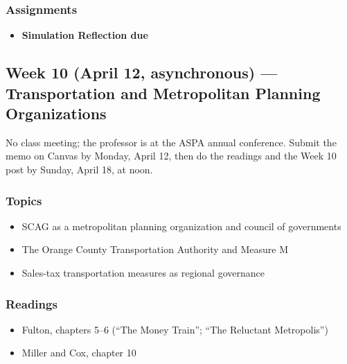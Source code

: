 \documentclass[12pt]{article}
\begin{document}
    \subsubsection*{Assignments}
        \begin{itemize}
            \item \textbf{Simulation Reflection due}
        \end{itemize}

\subsection*{Week 10 (April 12, asynchronous) --- Transportation and Metropolitan Planning Organizations}
    \noindent No class meeting; the professor is at the ASPA annual conference. Submit the memo on Canvas by Monday, April 12, then do the readings and the Week 10 post by Sunday, April 18, at noon.
    \subsubsection*{Topics}
        \begin{itemize}
            \item SCAG as a metropolitan planning organization and council of governments
            \item The Orange County Transportation Authority and Measure M
            \item Sales-tax transportation measures as regional governance
        \end{itemize}
    \subsubsection*{Readings}
        \begin{itemize}
            \item Fulton, chapters 5--6 (``The Money Train''; ``The Reluctant Metropolis'')
            \item Miller and Cox, chapter 10
        \end{itemize}
\end{document}

